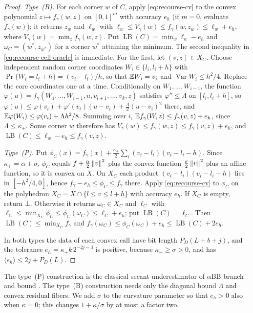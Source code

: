 \begin{proof}
\emph{Type~(B).} For each corner $w$ of $C$, apply
\eqref{eq:recourse-cv} to the convex polynomial $z\mapsto f_\gamma(w,z)$
on $[0,1]^m$ with accuracy $e_h$ (if $m=0$, evaluate $f_\gamma(w)$); it returns $z_w$ and $\ell_w$ with
$\ell_w\le V_\gamma(w)\le f_\gamma(w,z_w)\le\ell_w+e_h$, where
$V_\gamma(w)=\min_zf_\gamma(w,z)$. Put
$\operatorname{LB}(C)=\min_w\ell_w-e_h$ and $\omega_C=(w^*,z_{w^*})$
for a corner $w^*$ attaining the minimum. The second inequality in
\eqref{eq:recourse-cell-oracle} is immediate. For the first, let
$(v,z)\in X_C$. Choose independent random corner coordinates
$W_i\in\{l_i,l_i+h\}$ with $\Pr\{W_i=l_i+h\}=(v_i-l_i)/h$, so that
$\mathbb E W_i=v_i$ and $\operatorname{Var}W_i\le h^2/4$. Replace the core
coordinates one at a time. Conditionally on $W_1,\ldots,W_{i-1}$, the
function $\varphi(u)=f_\gamma(W_1,\ldots,W_{i-1},u,v_{i+1},\ldots,v_k,z)$
satisfies $\varphi''\le\Lambda$ on $[l_i,l_i+h]$, so
$\varphi(u)\le\varphi(v_i)+\varphi'(v_i)(u-v_i)+\frac\Lambda2(u-v_i)^2$
there, and $\mathbb E\varphi(W_i)\le\varphi(v_i)+\Lambda h^2/8$. Summing over
$i$, $\mathbb E f_\gamma(W,z)\le f_\gamma(v,z)+e_h$, since $\Lambda\le\kappa_+$.
Some corner $w$ therefore has $V_\gamma(w)\le f_\gamma(w,z)\le
f_\gamma(v,z)+e_h$, and
$\operatorname{LB}(C)\le\ell_w-e_h\le f_\gamma(v,z)$.

\emph{Type~(P).} Put
$\phi_C(x)=f_\gamma(x)+\frac{\kappa_+}2\sum_i(v_i-l_i)(v_i-l_i-h)$. Since
$\kappa_+=\alpha+\sigma$, $\phi_C$ equals $f+\frac\alpha2\left\lVert v\right\rVert^2$ plus
the convex function $\frac\sigma2\left\lVert v\right\rVert^2$ plus an affine function, so
it is convex on $X$. On $X_C$ each product $(v_i-l_i)(v_i-l_i-h)$ lies
in $[-h^2/4,0]$, hence $f_\gamma-e_h\le\phi_C\le f_\gamma$ there. Apply
\eqref{eq:recourse-cv} to $\phi_C$ on the polyhedron
$X_C=X\cap\{l\le v\le l+h\}$ with accuracy $e_h$. If $X_C$ is empty,
return $\bot$. Otherwise it returns $\omega_C\in X_C$ and $\ell_C$ with
$\ell_C\le\min_{X_C}\phi_C\le\phi_C(\omega_C)\le\ell_C+e_h$; put
$\operatorname{LB}(C)=\ell_C$. Then $\operatorname{LB}(C)\le
\min_{X_C}f_\gamma$ and $f_\gamma(\omega_C)\le\phi_C(\omega_C)+e_h\le
\operatorname{LB}(C)+2e_h$.

In both types the data of each convex call have bit length
$P_D(L+b+j)$, and the tolerance $e_h=\kappa_+k\,2^{-2j-3}$ is positive,
because $\kappa_+\ge\sigma>0$, and has $\langle e_h\rangle\le2j+P_D(L)$.
\end{proof}

The type~(P) construction is the classical secant underestimator of
$\alpha$BB branch and bound \citep{AndroulakisMaranasFloudas1995}. The
type~(B) construction needs only the diagonal bound $\Lambda$ and convex
residual fibers. We add $\sigma$ to the curvature parameter so that
$e_h>0$ also when $\kappa=0$; this changes $1+\kappa/\sigma$ by at most a
factor two.

